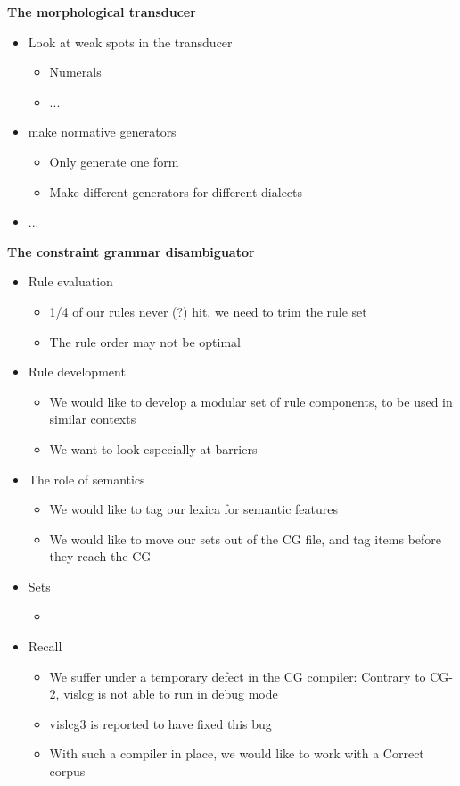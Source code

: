 \documentclass[landscape,english,11pt]{seminar}
\begin{document}
\begin{slide}
\newslide
\textbf{The morphological transducer}
\begin{itemize}
\item Look at weak spots in the transducer
\begin{itemize}
\item Numerals
\item ...
\end{itemize}
\item make normative generators
\begin{itemize}
\item Only generate one form
\item Make different generators for different dialects
\end{itemize}
\item ...
\end{itemize}


\newslide
\textbf{The constraint grammar disambiguator}
\begin{itemize}
\item Rule evaluation
  \begin{itemize}
  \item 1/4 of our rules never (?) hit, we need to trim the rule set
  \item The rule order may not be optimal
  \end{itemize}
\item Rule development
  \begin{itemize}
  \item We would like to develop a modular set of rule components, to be used in similar contexts
  \item We want to look especially at barriers
  \end{itemize}
\item The role of semantics
  \begin{itemize}
  \item We would like to tag our lexica for semantic features
  \item We would like to move our sets out of the CG file, and tag items before they reach the CG
  \end{itemize}
\item Sets
  \begin{itemize}
  \item
  \end{itemize}
\item Recall
  \begin{itemize}
  \item We suffer under a temporary defect in the CG compiler: Contrary to CG-2, vislcg is not able to run in debug mode
  \item vislcg3 is reported to have fixed this bug
  \item With such a compiler in place, we would like to work with a Correct corpus
  \end{itemize}
\end{itemize}




\end{slide}
\end{document}
